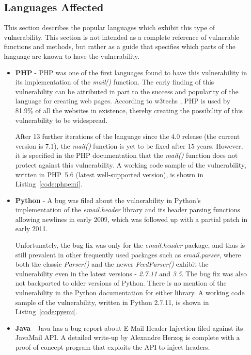 \subsection{Languages Affected}
\label{languages}
This section describes the popular languages which exhibit this type of vulnerability. This section is not intended as a complete reference of vulnerable functions and methods, but rather as a guide that specifies which parts of the language are known to have the vulnerability.

\begin{itemize}
\item{\textbf{PHP}} - PHP was one of the first languages found to have this vulnerability in its implementation of the \emph{mail()} function. The early finding of this vulnerability can be attributed in part to the success and popularity of the language for creating web pages. According to w3techs \cite{W3techs}, PHP is used by 81.9\% of all the websites in existence, thereby creating the possibility of this vulnerability to be widespread. 

After 13 further iterations of the language since the 4.0 release (the current version is 7.1), the \emph{mail()} function is yet to be fixed after 15 years. However, it is specified in the PHP documentation \cite{PHPDocs} that the \emph{mail()} function does not protect against this vulnerability.
A working code sample of the vulnerability, written in PHP~5.6 (latest well-supported version), is shown in  Listing~\ref{code:phpemi}.

\item{\textbf{Python}} -
A bug was filed about the vulnerability in Python's implementation of the \emph{email.header} library and its header parsing functions allowing newlines in early 2009, which was followed up with a partial patch in early 2011. 

Unfortunately, the bug fix was only for the \emph{email.header} package, and thus is still prevalent in other frequently used packages such as \emph{email.parser}, where both the classic \emph{Parser()} and the newer \emph{FeedParser()} exhibit the vulnerability even in the latest versions - \emph{2.7.11} and \emph{3.5}. The bug fix was also not backported to older versions of Python. 
There is no mention of the vulnerability in the Python documentation for either library.
A working code sample of the vulnerability, written in Python 2.7.11, is shown in Listing~\ref{code:pyemi}.


\item{\textbf{Java}} -
Java has a bug report about E-Mail Header Injection filed against its JavaMail API. A detailed write-up by Alexandre Herzog \cite{Herzog.2014} is complete with a proof of concept program that exploits the API to inject headers.


\end{itemize}
